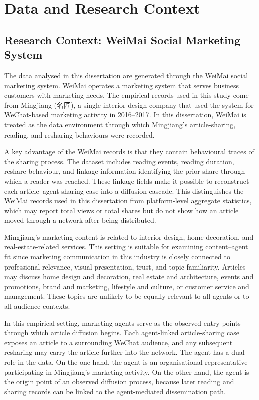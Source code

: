 ﻿\chapter{Data and Research Context}
\label{chap:data-and-research-context}

\section{Research Context: WeiMai Social Marketing System}
\label{sec:3-1-research-context-weimai-social-marketing-system}

The data analysed in this dissertation are generated through the WeiMai social marketing system. WeiMai operates a marketing system that serves business customers with marketing needs. The empirical records used in this study come from Mingjiang ({\cjkfont 名匠}), a single interior-design company that used the system for WeChat-based marketing activity in 2016–2017. In this dissertation, WeiMai is treated as the data environment through which Mingjiang’s article-sharing, reading, and resharing behaviours were recorded.

A key advantage of the WeiMai records is that they contain behavioural traces of the sharing process. The dataset includes reading events, reading duration, reshare behaviour, and linkage information identifying the prior share through which a reader was reached. These linkage fields make it possible to reconstruct each article–agent sharing case into a diffusion cascade. This distinguishes the WeiMai records used in this dissertation from platform-level aggregate statistics, which may report total views or total shares but do not show how an article moved through a network after being distributed.

Mingjiang’s marketing content is related to interior design, home decoration, and real-estate-related services. This setting is suitable for examining content–agent fit since marketing communication in this industry is closely connected to professional relevance, visual presentation, trust, and topic familiarity. Articles may discuss home design and decoration, real estate and architecture, events and promotions, brand and marketing, lifestyle and culture, or customer service and management. These topics are unlikely to be equally relevant to all agents or to all audience contexts.

In this empirical setting, marketing agents serve as the observed entry points through which article diffusion begins. Each agent-linked article-sharing case exposes an article to a surrounding WeChat audience, and any subsequent resharing may carry the article further into the network. The agent has a dual role in the data. On the one hand, the agent is an organisational representative participating in Mingjiang’s marketing activity. On the other hand, the agent is the origin point of an observed diffusion process, because later reading and sharing records can be linked to the agent-mediated dissemination path.

